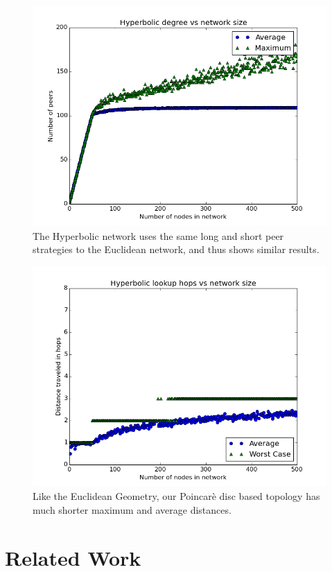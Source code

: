 \begin{figure}
\centering
\includegraphics[width=\linewidth]{figs/HyperbolicDegree}
\caption{The Hyperbolic network uses the same long and short peer strategies to the Euclidean network, and thus shows similar results.}
\label{fig:HyperbolicDegree}
\end{figure}
\begin{figure}
\centering
\includegraphics[width=\linewidth]{figs/HyperbolicDistance}
\caption{Like the Euclidean Geometry, our Poincar\`{e} disc based topology has much shorter maximum and average distances.
}
\label{fig:HyperbolicDistance}
\end{figure}


\section{Related Work}\label{sec:related}

